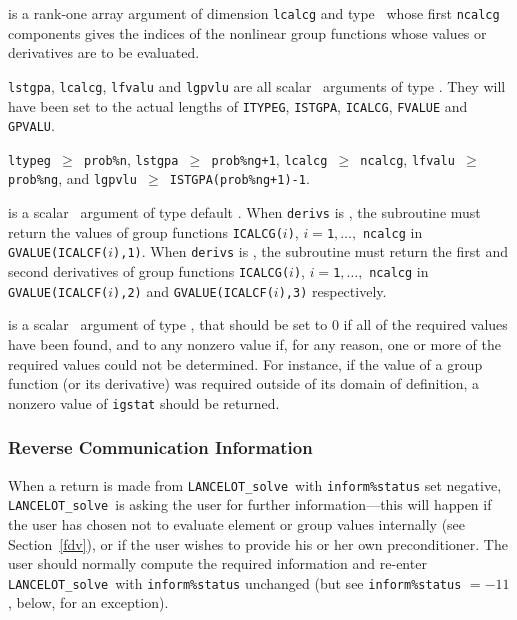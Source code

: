 \documentclass{galahad}
\newcommand{\fullpackagename}{LANC\-E\-LOT}
\newcommand{\solver}{{\tt \fullpackagename\_solve}}
\begin{document}
\begin{description}
 is a rank-one \intentin array argument of
dimension {\tt lcalcg} and type \integer\,
whose first {\tt ncalcg} components
gives the indices of the nonlinear group functions whose values or
derivatives are to be evaluated.

 \hspace*{-2mm}
{\tt lstgpa},
{\tt lcalcg},
{\tt lfvalu} and
{\tt lgpvlu}
are all scalar \intentin\ arguments of type \integer.
They will have been set to the actual lengths of
{\tt ITYPEG},
{\tt ISTGPA},
{\tt ICALCG},
{\tt FVALUE} and
{\tt GPVALU}.

\restrictions
{\tt ltypeg $\geq$  prob\%n},
{\tt lstgpa $\geq$ prob\%ng+1},
{\tt lcalcg $\geq$ ncalcg},
{\tt lfvalu $\geq$ prob\%ng}, and
{\tt lgpvlu $\geq$ ISTGPA(prob\%ng+1)-1}.

 is a scalar \intentin\ argument of type default \logical.
When {\tt derivs} is \false, the subroutine must return
the values of group functions
{\tt ICALCG($i$)}, $i = ${\tt 1}$, \ldots ,$ {\tt ncalcg} in
{\tt GVALUE(ICALCF($i$),1)}.
When {\tt derivs} is \true, the subroutine must return
the first and second derivatives of group functions
{\tt ICALCG($i$)}, $i = ${\tt 1}$, \ldots ,$ {\tt ncalcg} in
{\tt GVALUE(ICALCF($i$),2)}
and
{\tt GVALUE(ICALCF($i$),3)}
respectively.

 is a scalar \intentout\ argument of type \integer,
that should be set to 0 if all of the required values have been found,
and to any nonzero value if, for any reason, one or more of the required
values could not be determined. For instance, if the value of a
group function (or its derivative) was required outside of its domain of
definition, a nonzero value of {\tt igstat} should be returned.

\end{description}

\subsubsection{\label{reverse}Reverse Communication Information}

When a return is made from \solver\
with {\tt inform\%status} set negative,
\solver\
is asking the user for further information---this will happen
if the user has chosen not to evaluate element or group values
internally (see Section~\ref{fdv}), or if the user wishes to provide
his or her own preconditioner. The user
should normally compute the required information and re-enter \solver\
with {\tt inform\%status} unchanged
(but see {\tt inform\%status} $= -11$, below, for an exception).
\end{document}
